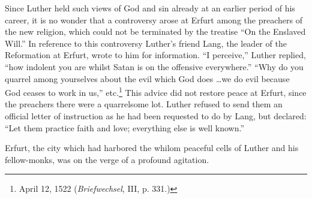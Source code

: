 Since Luther held such views of God and sin already at an
earlier period of his career, it is no wonder that a controversy arose
at Erfurt among the preachers of the new religion, which could
not be terminated by the treatise “On the Enslaved Will.” In
reference to this controversy Luther’s friend Lang, the leader of
the Reformation at Erfurt, wrote to him for information. “I perceive,”
Luther replied, “how indolent you are whilst Satan is on
the offensive everywhere.” “Why do you quarrel among yourselves
about the evil which God does \dots we do evil because God ceases
to work in us,” etc.\footnote{April 12, 1522 (\textit{Briefwechsel}, III, p. 331.)}
This advice did not restore peace at Erfurt, since
the preachers there were a quarrelsome lot. Luther refused to send
them an official letter of instruction as he had been requested to do by
Lang, but declared: “Let them practice faith and love; everything
else is well known.”

Erfurt, the city which had harbored the whilom peaceful cells
of Luther and his fellow-monks, was on the verge of a profound
agitation.

